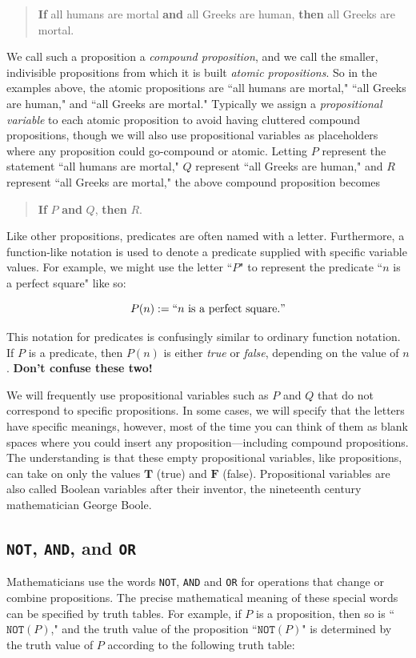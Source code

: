 \documentclass[11pt,oneside]{book}
\theoremstyle{definition}
\newcommand{\T}{\mathbf{T}}
\newcommand{\F}{\mathbf{F}}
\begin{document}
\begin{quote}
    \textbf{If} all humans are mortal \textbf{and} all Greeks are human, \textbf{then} all Greeks are mortal.
\end{quote}

We call such a proposition a \emph{compound proposition}, and we call the smaller, indivisible propositions from which it is built \emph{atomic propositions}.
So in the examples above, the atomic propositions are ``all humans are mortal," ``all Greeks are human," and ``all Greeks are mortal."
Typically we assign a \emph{propositional variable} to each atomic proposition to avoid having cluttered compound propositions, though we will also use propositional variables as placeholders where any proposition could go-compound or atomic.
Letting $P$ represent the statement ``all humans are mortal," $Q$ represent ``all Greeks are human," and $R$ represent ``all Greeks are mortal," the above compound proposition becomes

\begin{quote}
    \textbf{If} $P$ \textbf{and} $Q$, \textbf{then} $R$.
\end{quote}

Like other propositions, predicates are often named with a letter.
Furthermore, a function-like notation is used to denote a predicate supplied with specific variable values.
For example, we might use the letter ``$P$" to represent the predicate ``$n$ is a perfect square" like so:

\[ P(n) := ``n \text{ is a perfect square}." \]

This notation for predicates is confusingly similar to ordinary function notation.
If $P$ is a predicate, then $P(n)$ is either \emph{true} or \emph{false}, depending on the value of $n$.
\textbf{Don't confuse these two!}

We will frequently use propositional variables such as $P$ and $Q$ that do not correspond to specific propositions.
In some cases, we will specify that the letters have specific meanings, however, most of the time you can think of them as blank spaces where you could insert any proposition---including compound propositions.
The understanding is that these empty propositional variables, like propositions, can take on only the values $\T$ (true) and $\F$ (false).
Propositional variables are also called Boolean variables after their inventor, the nineteenth century mathematician George Boole.


\subsection{\texttt{NOT}, \texttt{AND}, and \texttt{OR}} %
Mathematicians use the words \texttt{NOT}, \texttt{AND} and \texttt{OR} for operations that change or combine propositions.
The precise mathematical meaning of these special words can be specified by truth tables.
For example, if $P$ is a proposition, then so is ``$\texttt{NOT}(P)$," and the truth value of the proposition ``$\texttt{NOT}(P)$" is determined by the truth value of $P$ according to the following truth table:
\end{document}
